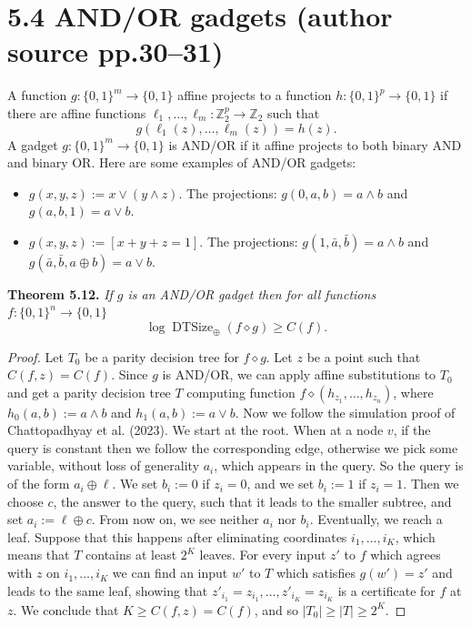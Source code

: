 \documentclass[10pt,a4paper]{article}
\newcommand{\bits}{\{0,1\}}
\newcommand{\DTSize}{\operatorname{DTSize}}
\newcommand{\comp}{\diamond}
\newenvironment{originalresult}[1]{\par\medskip\noindent\textbf{#1.}\itshape}{\par\medskip}
\begin{document}
\section*{5.4 AND/OR gadgets (author source pp.30--31)}
A function $g:\bits^m\to\bits$ affine projects to a function $h:\bits^p\to\bits$ if there are affine functions $\ell_1,\ldots,\ell_m:\mathbb Z_2^p\to\mathbb Z_2$ such that
\[g(\ell_1(z),\ldots,\ell_m(z))=h(z).\]
A gadget $g:\bits^m\to\bits$ is AND/OR if it affine projects to both binary AND and binary OR. Here are some examples of AND/OR gadgets:
\begin{itemize}
\item $g(x,y,z):=x\vee(y\wedge z)$. The projections: $g(0,a,b)=a\wedge b$ and $g(a,b,1)=a\vee b$.
\item $g(x,y,z):=[x+y+z=1]$. The projections: $g(1,\bar a,\bar b)=a\wedge b$ and $g(\bar a,\bar b,a\oplus b)=a\vee b$.
\end{itemize}
\begin{originalresult}{Theorem 5.12}
If $g$ is an AND/OR gadget then for all functions $f:\bits^n\to\bits$
\[\log\DTSize_\oplus(f\comp g)\ge C(f).\]
\end{originalresult}
\begin{proof}
Let $T_0$ be a parity decision tree for $f\comp g$. Let $z$ be a point such that $C(f,z)=C(f)$. Since $g$ is AND/OR, we can apply affine substitutions to $T_0$ and get a parity decision tree $T$ computing function $f\comp(h_{z_1},\ldots,h_{z_n})$, where $h_0(a,b):=a\wedge b$ and $h_1(a,b):=a\vee b$.
Now we follow the simulation proof of Chattopadhyay et al. (2023). We start at the root. When at a node $v$, if the query is constant then we follow the corresponding edge, otherwise we pick some variable, without loss of generality $a_i$, which appears in the query. So the query is of the form $a_i\oplus\ell$. We set $b_i:=0$ if $z_i=0$, and we set $b_i:=1$ if $z_i=1$. Then we choose $c$, the answer to the query, such that it leads to the smaller subtree, and set $a_i:=\ell\oplus c$. From now on, we see neither $a_i$ nor $b_i$.
Eventually, we reach a leaf. Suppose that this happens after eliminating coordinates $i_1,\ldots,i_K$, which means that $T$ contains at least $2^K$ leaves. For every input $z'$ to $f$ which agrees with $z$ on $i_1,\ldots,i_K$ we can find an input $w'$ to $T$ which satisfies $g(w')=z'$ and leads to the same leaf, showing that $z'_{i_1}=z_{i_1},\ldots,z'_{i_K}=z_{i_K}$ is a certificate for $f$ at $z$. We conclude that $K\ge C(f,z)=C(f)$, and so $|T_0|\ge|T|\ge2^K$.
\end{proof}
\end{document}
